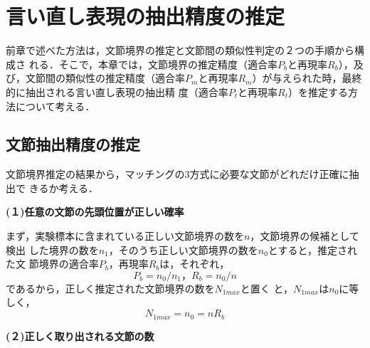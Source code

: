 \section{言い直し表現の抽出精度の推定}

前章で述べた方法は，文節境界の推定と文節間の類似性判定の２つの手順から構成さ
れる．そこで，本章では，文節境界の推定精度（適合率$P_b$と再現率$R_b$），及
び，文節間の類似性の推定精度（適合率$P_m$と再現率$R_m$）が与えられた時，最終
的に抽出される言い直し表現の抽出精\break
度（適合率$P_t$と再現率$R_t$）を推定する方
法について考える．

\subsection{文節抽出精度の推定}

文節境界推定の結果から，マッチングの3方式に必要な文節がどれだけ正確に抽出で
きるか考える．
\begin{flushleft}
  \bf (１)任意の文節の先頭位置が正しい確率
\end{flushleft}

まず，実験標本に含まれている正しい文節境界の数を$n$，文節境界の候補として検出
した境界の数を$n_1$，そのうち正しい文節境界の数を$n_0$とすると，推定された文
節境界の適合率$P_b$，再現率$R_b$は，それぞれ，
\begin{equation}
  P_b = n_0 / n_1，R_b = n_0 / n
\end{equation}
であるから，正しく推定された文節境界の数を$N_{1max}$と置く
と，$N_{1max}$は$n_0$に等しく，
\begin{equation}
     N_{1max} = n_0 = n R_b
\end{equation}
\begin{flushleft}
  \bf (２)正しく取り出される文節の数
\end{flushleft}

